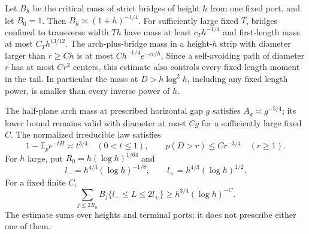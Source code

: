 \begin{proposition}\label{R:cal:inputs}
Let $B_h$ be the critical mass of strict bridges of height $h$ from one
fixed port, and let $B_0=1$. Then $B_h\asymp(1+h)^{-1/4}$. For sufficiently
large fixed $T$, bridges confined to transverse width $Th$ have mass at
least $c_T h^{-1/4}$ and first-length mass at most $C_T h^{13/12}$.
The arch-plus-bridge mass in a height-$h$ strip with diameter larger than
$r\ge Ch$ is at most $C h^{-1/4}e^{-cr/h}$. Since a self-avoiding path of
diameter $r$ has at most $Cr^2$ centers, this estimate also controls every
fixed length moment in the tail. In particular the mass at
$D>h\log^2 h$, including any fixed length power, is smaller than every
inverse power of $h$.

The half-plane arch mass at prescribed horizontal gap $g$ satisfies
$A_g\asymp g^{-5/4}$; its lower bound remains valid with diameter at most
$Cg$ for a sufficiently large fixed $C$.
The normalized irreducible law satisfies
\[
 1-\mathbb E_p e^{-tH}\asymp t^{3/4}\quad(0<t\le1),\qquad
 p(D>r)\le C r^{-3/4}\quad(r\ge1).
\]
For $h$ large, put $R_0=h(\log h)^{1/64}$ and
\[
 l_-=h^{4/3}(\log h)^{-1/8},\qquad
 l_+=h^{4/3}(\log h)^{1/2}.
\]
For a fixed finite $C$,
\begin{equation}
 \sum_{j\le2R_0}B_j\{l_-\le L\le2l_+\}
       \ge h^{3/4}(\log h)^{-C}.
 \label{R:cal:window}
\end{equation}
The estimate sums over heights and terminal ports; it does not prescribe
either one of them.
\end{proposition}

